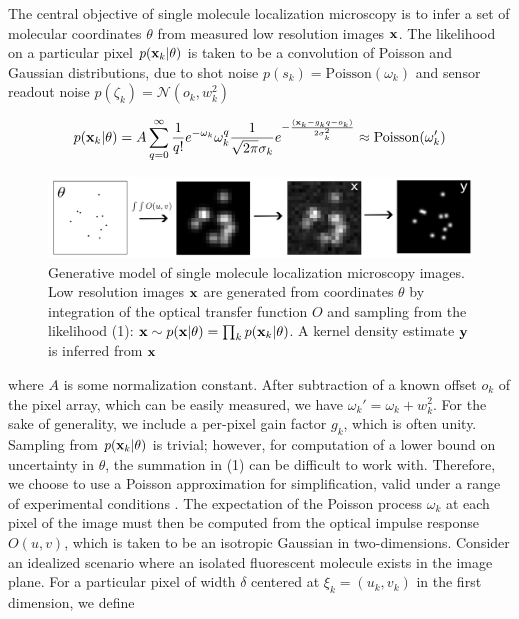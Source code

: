 \documentclass{article}
\begin{document}
The central objective of single molecule localization microscopy is to infer a set of molecular coordinates $\theta$ from measured low resolution images $\bold{x}$. The likelihood on a particular pixel $p(\bold{x}_k|\theta)$ is taken to be a convolution of Poisson and Gaussian distributions, due to shot noise $p(s_{k}) = \mathrm{Poisson}(\omega_{k})$ and sensor readout noise $p(\zeta_{k}) = \mathcal{N}(o_{k},w_{k}^{2})$ 

\begin{equation}
p(\bold{x}_{k}|\theta) = A\sum_{q=0}^{\infty} \frac{1}{q!}e^{-\omega_{k}}\omega_{k}^{q}\frac{1}{\sqrt{2\pi}\sigma_{k}}e^{-\frac{(\bold{x}_{k}-g_{k}q-o_{k})}{2\sigma_{k}^{2}}} \approx \mathrm{Poisson}(\omega_{k}')
\end{equation}


\begin{figure}
\includegraphics[scale=0.225]{media/Generation.png}
\caption{Generative model of single molecule localization microscopy images. Low resolution images $\bold{x}$ are generated from coordinates $\theta$ by integration of the optical transfer function $O$ and sampling from the likelihood (1): $\bold{x}\sim p(\bold{x}|\theta) = \prod_{k} p(\bold{x}_k|\theta)$. A kernel density estimate $\bold{y}$ is inferred from $\bold{x}$}
\end{figure}

where $A$ is some normalization constant. After subtraction of a known offset $o_{k}$ of the pixel array, which can be easily measured, we have $\omega_{k}' = \omega_{k} + w_{k}^{2}$. For the sake of generality, we include a per-pixel gain factor $g_{k}$, which is often unity. Sampling from $p(\bold{x}_{k}|\theta)$ is trivial; however, for computation of a lower bound on uncertainty in $\theta$, the summation in (1) can be difficult to work with. Therefore, we choose to use a Poisson approximation for simplification, valid under a range of experimental conditions \citep{Huang2013}. The expectation of the Poisson process $\omega_{k}$ at each pixel of the image must then be computed from the optical impulse response $O(u,v)$, which is taken to be an isotropic Gaussian in two-dimensions. Consider an idealized scenario where an isolated fluorescent molecule exists in the image plane. For a particular pixel of width $\delta$ centered at $\xi_{k}=(u_k,v_k)$ in the first dimension, we define
\end{document}
